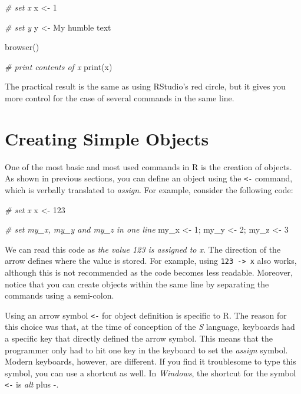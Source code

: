 \documentclass[
  12pt,
]{book}
\newenvironment{Shaded}{\begin{snugshade}}{\end{snugshade}}
\newcommand{\CommentTok}[1]{\textcolor[rgb]{0.37,0.37,0.37}{\textit{#1}}}
\newcommand{\DecValTok}[1]{\textcolor[rgb]{0.06,0.06,0.06}{#1}}
\newcommand{\FunctionTok}[1]{\textcolor[rgb]{0,0,0}{#1}}
\newcommand{\NormalTok}[1]{#1}
\newcommand{\OtherTok}[1]{\textcolor[rgb]{0.37,0.37,0.37}{#1}}
\newcommand{\StringTok}[1]{\textcolor[rgb]{0.5,0.5,0.5}{#1}}
\newenvironment{rmdimportant}
{\begin{importantblock}
		
	} {\end{importantblock}}
\begin{document}
\begin{Shaded}
\begin{Highlighting}[]
\CommentTok{\# set x}
\NormalTok{x }\OtherTok{\textless{}{-}} \DecValTok{1}

\CommentTok{\# set y}
\NormalTok{y }\OtherTok{\textless{}{-}} \StringTok{\textquotesingle{}My humble text\textquotesingle{}}

\FunctionTok{browser}\NormalTok{()}

\CommentTok{\# print contents of x}
\FunctionTok{print}\NormalTok{(x)}
\end{Highlighting}
\end{Shaded}

The practical result is the same as using RStudio's red circle, but it gives you more control for the case of several commands in the same line.

\hypertarget{creating-simple-objects}{%
\section{Creating Simple Objects}\label{creating-simple-objects}}

One of the most basic and most used commands in R is the creation of objects. As shown in previous sections, you can define an object using the \texttt{\textless{}-} command, which is verbally translated to \emph{assign}. For example, consider the following code: 

\begin{Shaded}
\begin{Highlighting}[]
\CommentTok{\# set x}
\NormalTok{x }\OtherTok{\textless{}{-}} \DecValTok{123}

\CommentTok{\# set my\_x, my\_y and my\_z in one line}
\NormalTok{my\_x }\OtherTok{\textless{}{-}} \DecValTok{1}\NormalTok{; my\_y }\OtherTok{\textless{}{-}} \DecValTok{2}\NormalTok{; my\_z }\OtherTok{\textless{}{-}} \DecValTok{3}
\end{Highlighting}
\end{Shaded}

We can read this code as \emph{the value 123 is assigned to x}. The direction of the arrow defines where the value is stored. For example, using \texttt{123\ -\textgreater{}\ x} also works, although this is not recommended as the code becomes less readable. Moreover, notice that you can create objects within the same line by separating the commands using a semi-colon.

\begin{rmdimportant}
Using an arrow symbol \texttt{\textless{}-} for object definition is
specific to R. The reason for this choice was that, at the time of
conception of the \emph{S} language, keyboards had a specific key that
directly defined the arrow symbol. This means that the programmer only
had to hit one key in the keyboard to set the \emph{assign} symbol.
Modern keyboards, however, are different. If you find it troublesome to
type this symbol, you can use a shortcut as well. In \emph{Windows}, the
shortcut for the symbol \texttt{\textless{}-} is \emph{alt} plus -.
\end{rmdimportant}
\end{document}
